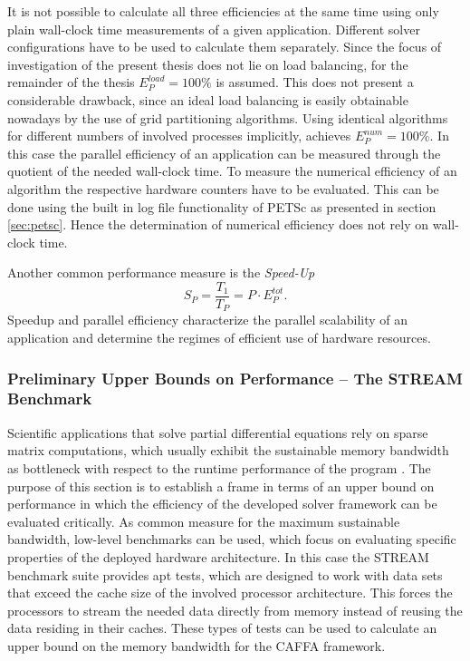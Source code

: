 It is not possible to calculate all three efficiencies at the same time using only plain wall-clock time measurements of a given application.  Different solver configurations have to be used to calculate them separately. Since the focus of investigation of the present thesis does not lie on load balancing, for the remainder of the thesis \(E^{load}_P = 100\%  \) is assumed. This does not present a considerable drawback, since an ideal load balancing is easily obtainable nowadays by the use of grid partitioning algorithms. Using identical algorithms for different numbers of involved processes implicitly, achieves \(E^{num}_P = 100 \%\). In this case the parallel efficiency of an application can be measured through the quotient of the needed wall-clock time. To measure the numerical efficiency of an algorithm the respective hardware counters have to be evaluated. This can be done using the built in log file functionality of PETSc as presented in section \ref{sec:petsc}. Hence the determination of numerical efficiency does not rely on wall-clock time.

Another common performance measure is the \emph{Speed-Up}
\begin{displaymath}
  S_P = \frac{T_1}{T_P} = P \cdot E^{tot}_P.
\end{displaymath}
Speedup and parallel efficiency characterize the parallel scalability of an application and determine the regimes of efficient use of hardware resources.

\subsubsection{Preliminary Upper Bounds on Performance -- The STREAM Benchmark}

Scientific applications that solve partial differential equations rely on sparse matrix computations, which usually exhibit the sustainable memory bandwidth as bottleneck with respect to the runtime performance of the program \cite{hager11}. The purpose of this section is to establish a frame in terms of an upper bound on performance in which the efficiency of the developed solver framework can be evaluated critically. As common measure for the maximum sustainable bandwidth, low-level benchmarks can be used, which focus on evaluating specific properties of the deployed hardware architecture. In this case the STREAM benchmark suite \cite{mccalpin07,mccalpin95} provides apt tests, which are designed to work with data sets that exceed the cache size of the involved processor architecture. This forces the processors to stream the needed data directly from memory instead of reusing the data residing in their caches. These types of tests can be used to calculate an upper bound on the memory bandwidth for the CAFFA framework.

